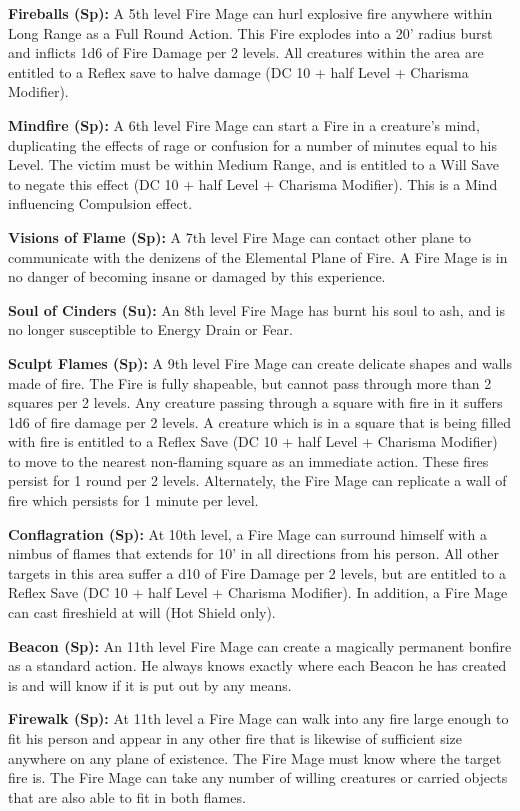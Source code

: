\textbf{Fireballs (Sp):} A 5th level Fire Mage can hurl explosive fire anywhere within Long Range as a Full Round Action. This Fire explodes into a 20' radius burst and inflicts 1d6 of Fire Damage per 2 levels. All creatures within the area are entitled to a Reflex save to halve damage (DC 10 + half Level + Charisma Modifier).

\textbf{Mindfire (Sp):} A 6th level Fire Mage can start a Fire in a creature's mind, duplicating the effects of rage or confusion for a number of minutes equal to his Level. The victim must be within Medium Range, and is entitled to a Will Save to negate this effect (DC 10 + half Level + Charisma Modifier). This is a Mind influencing Compulsion effect.

\textbf{Visions of Flame (Sp):} A 7th level Fire Mage can contact other plane to communicate with the denizens of the Elemental Plane of Fire. A Fire Mage is in no danger of becoming insane or damaged by this experience.

\textbf{Soul of Cinders (Su):} An 8th level Fire Mage has burnt his soul to ash, and is no longer susceptible to Energy Drain or Fear.

\textbf{Sculpt Flames (Sp):} A 9th level Fire Mage can create delicate shapes and walls made of fire. The Fire is fully shapeable, but cannot pass through more than 2 squares per 2 levels. Any creature passing through a square with fire in it suffers 1d6 of fire damage per 2 levels. A creature which is in a square that is being filled with fire is entitled to a Reflex Save (DC 10 + half Level + Charisma Modifier) to move to the nearest non-flaming square as an immediate action. These fires persist for 1 round per 2 levels. Alternately, the Fire Mage can replicate a wall of fire which persists for 1 minute per level.

\textbf{Conflagration (Sp):} At 10th level, a Fire Mage can surround himself with a nimbus of flames that extends for 10' in all directions from his person. All other targets in this area suffer a d10 of Fire Damage per 2 levels, but are entitled to a Reflex Save (DC 10 + half Level + Charisma Modifier). In addition, a Fire Mage can cast fireshield at will (Hot Shield only).

\textbf{Beacon (Sp):} An 11th level Fire Mage can create a magically permanent bonfire as a standard action. He always knows exactly where each Beacon he has created is and will know if it is put out by any means.

\textbf{Firewalk (Sp):} At 11th level a Fire Mage can walk into any fire large enough to fit his person and appear in any other fire that is likewise of sufficient size anywhere on any plane of existence. The Fire Mage must know where the target fire is. The Fire Mage can take any number of willing creatures or carried objects that are also able to fit in both flames.

